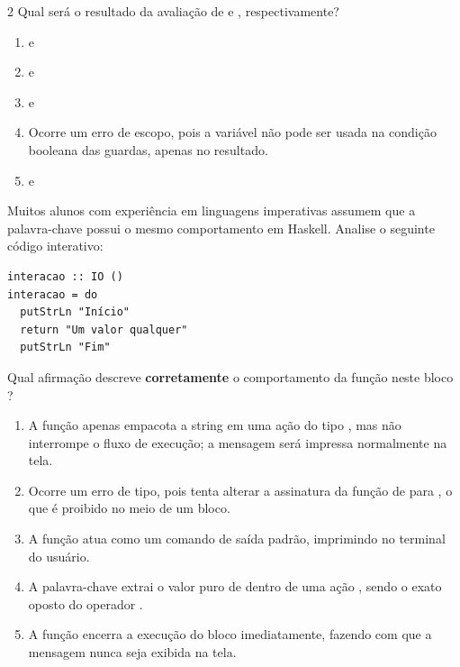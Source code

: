 \documentclass[a4paper,10pt,brazil]{article}
\begin{document}
\begin{multicols}{2}
Qual será o resultado da avaliação de  e , respectivamente?

\begin{enumerate}
  \item {} e 

  \item {} e 

  \item {} e 

  \item Ocorre um erro de escopo, pois a variável  não pode ser usada na condição booleana das guardas, apenas no resultado.

  \item {} e 


\end{enumerate}

Muitos alunos com experiência em linguagens imperativas assumem que a palavra-chave  possui o mesmo comportamento em Haskell. Analise o seguinte código interativo:

\begin{verbatim}
interacao :: IO ()
interacao = do
  putStrLn "Início"
  return "Um valor qualquer"
  putStrLn "Fim"
\end{verbatim}

Qual afirmação descreve \textbf{corretamente} o comportamento da função  neste bloco ?

\begin{enumerate}
  \item A função  apenas empacota a string em uma ação do tipo , mas não interrompe o fluxo de execução; a mensagem  será impressa normalmente na tela.

  \item Ocorre um erro de tipo, pois  tenta alterar a assinatura da função de  para , o que é proibido no meio de um bloco.

  \item A função  atua como um comando de saída padrão, imprimindo  no terminal do usuário.

  \item A palavra-chave  extrai o valor puro de dentro de uma ação , sendo o exato oposto do operador \haskellinline{<-}.

  \item A função  encerra a execução do bloco  imediatamente, fazendo com que a mensagem  nunca seja exibida na tela.


\end{enumerate}


\end{multicols}
\end{document}
